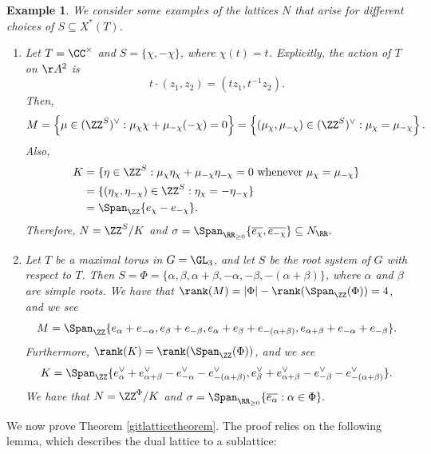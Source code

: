 \documentclass[12pt]{amsart}
\theoremstyle{plain}
\newtheorem{example}[theorem]{Example}
\begin{document}
\begin{example}
We consider some examples of the lattices $N$ that arise for different choices of $S \subseteq X^*(T)$.
\begin{enumerate}
\item
Let $T = \CC^\times$ and $S = \{\chi, -\chi\}$, where $\chi(t) = t$.
Explicitly, the action of $T$ on $\AA^2$ is
$$t \cdot (z_1, z_2) = (t z_1, t^{-1} z_2).$$
Then,
$$M = \left\{\mu\in(\ZZ^S)^\vee : \mu_\chi \chi + \mu_{-\chi}(-\chi) = 0\right\} = \left\{(\mu_{\chi}, \mu_{-\chi}) \in (\ZZ^S)^\vee : \mu_\chi = \mu_{-\chi} \right\}.$$
Also,
\begin{align*}
	K &= \{\eta \in \ZZ^S : \mu_\chi \eta_\chi + \mu_{-\chi} \eta_{-\chi} = 0 \text{ whenever } \mu_\chi = \mu_{-\chi}\} \\
	&= \{(\eta_\chi, \eta_{-\chi})\in\ZZ^S : \eta_\chi = - \eta_{-\chi}\} \\
	&=\Span_\ZZ\{e_\chi - e_{-\chi}\}.
\end{align*}
Therefore, $N = \ZZ^S / K$ and $\sigma = \Span_{\RR_{\ge 0}}\{\overline{e_\chi}, \overline{e_{-\chi}}\} \subseteq N_\RR.$

\item
Let $T$ be a maximal torus in $G = \GL_3$, and let $S$ be the root system of $G$ with respect to $T$.
Then $S = \Phi = \{\alpha, \beta, \alpha+\beta, -\alpha, -\beta, -(\alpha+\beta)\}$, where $\alpha$ and $\beta$ are simple roots.
We have that $\rank(M) = |\Phi| - \rank(\Span_\ZZ(\Phi)) = 4$, and we see
$$M = \Span_\ZZ\{e_\alpha+e_{-\alpha}, e_\beta + e_{-\beta}, e_\alpha + e_\beta + e_{-(\alpha+\beta)}, e_{\alpha+\beta}+e_{-\alpha}+e_{-\beta}\}.$$
Furthermore, $\rank(K) = \rank(\Span_\ZZ(\Phi))$, and we see
$$K = \Span_\ZZ\{e^\vee_\alpha + e^\vee_{\alpha+\beta} - e^\vee_{-\alpha} - e^\vee_{-(\alpha+\beta)}, e^\vee_\beta + e^\vee_{\alpha+\beta} - e^\vee_{-\beta} - e^\vee_{-(\alpha+\beta)}\}.$$
We have that $N = \ZZ^\Phi/K$ and $\sigma = \Span_{\RR_{\ge 0}}\{\overline{e_\alpha} : \alpha\in\Phi\}.$
\end{enumerate}
\end{example}

We now prove Theorem \ref{gitlatticetheorem}.
The proof relies on the following lemma, which describes the dual lattice to a sublattice:
\end{document}
